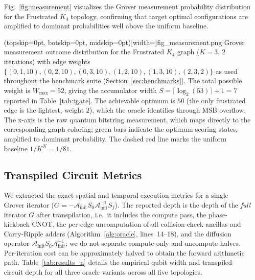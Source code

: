 \documentclass{ieeeaccess}
\begin{document}
Fig.~\ref{fig:measurement} visualizes the Grover measurement probability distribution for the Frustrated $K_4$ topology, confirming that target optimal configurations are amplified to dominant probabilities well above the uniform baseline.

\Figure[t!](topskip=0pt, botskip=0pt, midskip=0pt)[width=\columnwidth]{fig_measurement.png}
{Grover measurement outcome distribution for the Frustrated $K_4$ graph ($K\!=\!3$, 2 iterations) with edge weights $\{(0,1,10),(0,2,10),(0,3,10),(1,2,10),(1,3,10),(2,3,2)\}$ as used throughout the benchmark suite (Section~\ref{sec:benchmarks}). The total possible weight is $W_{\max}=52$, giving the accumulator width $S = \lceil\log_2(53)\rceil + 1 = 7$ reported in Table~\ref{tab:tgate}. The achievable optimum is $50$ (the only frustrated edge is the lightest, weight $2$), which the oracle identifies through MSB overflow. The x-axis is the raw quantum bitstring measurement, which maps directly to the corresponding graph coloring; green bars indicate the optimum-scoring states, amplified to dominant probability. The dashed red line marks the uniform baseline $1/K^N = 1/81$.\label{fig:measurement}}

\subsection{Transpiled Circuit Metrics}
We extracted the exact spatial and temporal execution metrics for a single Grover iterator ($G = -\mathcal{A}_{\text{init}} S_0 \mathcal{A}_{\text{init}}^{-1} S_f$). The reported depth is the depth of the \emph{full} iterator $G$ after transpilation, i.e.\ it includes the compute pass, the phase-kickback CNOT, the per-edge uncomputation of all collision-check ancillas and Carry-Ripple adders (Algorithm~\ref{alg:oracle}, lines~14--18), and the diffusion operator $\mathcal{A}_{\text{init}} S_0 \mathcal{A}_{\text{init}}^{-1}$; we do not separate compute-only and uncompute halves. Per-iteration cost can be approximately halved to obtain the forward arithmetic path. Table~\ref{tab:results_n} details the empirical qubit width and transpiled circuit depth for all three oracle variants across all five topologies.
\end{document}
